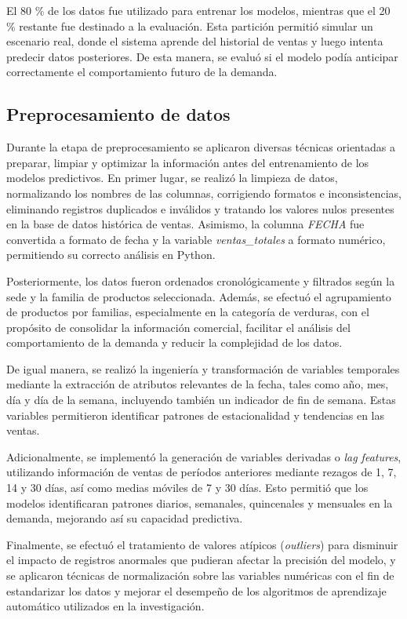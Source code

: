 El 80 \% de los datos fue utilizado para entrenar los modelos, mientras que el 20 \% restante fue destinado a la evaluación. Esta partición permitió simular un escenario real, donde el sistema aprende del historial de ventas y luego intenta predecir datos posteriores. De esta manera, se evaluó si el modelo podía anticipar correctamente el comportamiento futuro de la demanda.


\subsection{Preprocesamiento de datos}

Durante la etapa de preprocesamiento se aplicaron diversas técnicas orientadas a preparar, limpiar y optimizar la información antes del entrenamiento de los modelos predictivos. En primer lugar, se realizó la limpieza de datos, normalizando los nombres de las columnas, corrigiendo formatos e inconsistencias, eliminando registros duplicados e inválidos y tratando los valores nulos presentes en la base de datos histórica de ventas. Asimismo, la columna \textit{FECHA} fue convertida a formato de fecha y la variable \textit{ventas\_totales} a formato numérico, permitiendo su correcto análisis en Python.

Posteriormente, los datos fueron ordenados cronológicamente y filtrados según la sede y la familia de productos seleccionada. Además, se efectuó el agrupamiento de productos por familias, especialmente en la categoría de verduras, con el propósito de consolidar la información comercial, facilitar el análisis del comportamiento de la demanda y reducir la complejidad de los datos.

De igual manera, se realizó la ingeniería y transformación de variables temporales mediante la extracción de atributos relevantes de la fecha, tales como año, mes, día y día de la semana, incluyendo también un indicador de fin de semana. Estas variables permitieron identificar patrones de estacionalidad y tendencias en las ventas.

Adicionalmente, se implementó la generación de variables derivadas o \textit{lag features}, utilizando información de ventas de períodos anteriores mediante rezagos de 1, 7, 14 y 30 días, así como medias móviles de 7 y 30 días. Esto permitió que los modelos identificaran patrones diarios, semanales, quincenales y mensuales en la demanda, mejorando así su capacidad predictiva.

Finalmente, se efectuó el tratamiento de valores atípicos (\textit{outliers}) para disminuir el impacto de registros anormales que pudieran afectar la precisión del modelo, y se aplicaron técnicas de normalización sobre las variables numéricas con el fin de estandarizar los datos y mejorar el desempeño de los algoritmos de aprendizaje automático utilizados en la investigación.

